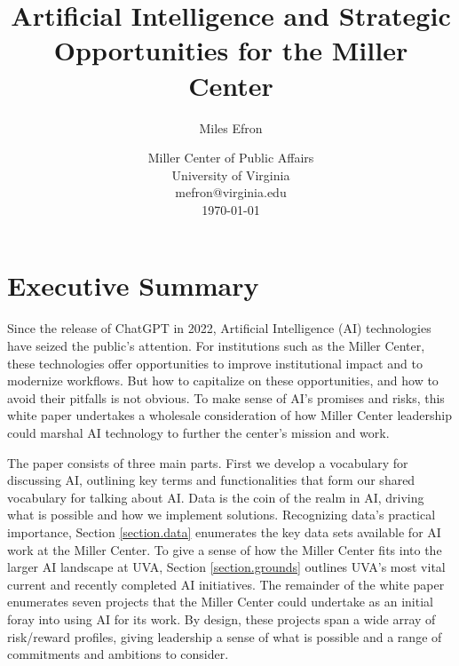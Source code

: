 \documentclass[12pt, oneside]{article}   	%
\title{Artificial Intelligence and Strategic Opportunities for the Miller Center}
\author{Miles Efron}
\date{
 Miller Center of Public Affairs \\
 University of Virginia \\
 mefron@virginia.edu \\
 \bigskip
 \today
}							%
\begin{document}
\maketitle


\pagebreak
\tableofcontents
\pagebreak


\section{Executive Summary}\label{section.summary}
Since the release of ChatGPT in 2022, Artificial Intelligence (AI) technologies have seized the public’s attention.  For institutions such as the Miller Center, these technologies offer opportunities to improve institutional impact and to modernize workflows. But how to capitalize on these opportunities, and how to avoid their  pitfalls is not obvious.  To make sense of AI’s promises and risks, this white paper undertakes a wholesale consideration of how Miller Center leadership could marshal AI technology  to further the center’s mission and work.  

The paper consists of three main parts.  First we develop a  vocabulary for discussing AI, outlining key terms and functionalities that form our shared vocabulary for talking about AI.  Data is the coin of the realm in AI, driving what is possible and how we  implement solutions.  Recognizing data's practical importance, Section \ref{section.data} enumerates the key data sets available for AI work at the Miller Center.  To give a sense of how the Miller Center fits into the larger AI landscape at UVA, Section \ref{section.grounds} outlines UVA's most vital current and recently completed AI initiatives.  The remainder of the white paper enumerates seven projects that the Miller Center could undertake as an initial foray into using AI for its work.  By design, these projects span a wide array of risk/reward profiles, giving leadership a sense of what is possible and a range of commitments and ambitions to consider.
\end{document}
